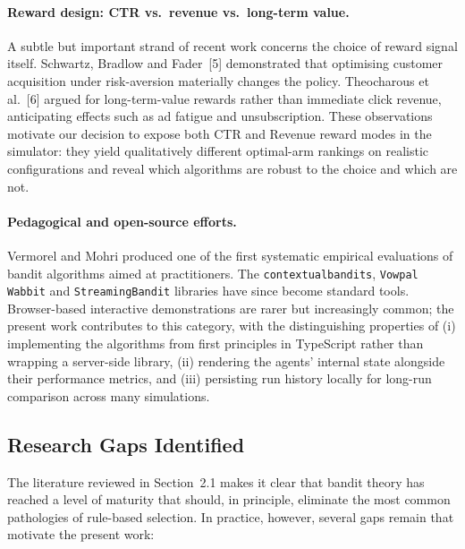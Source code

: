 \paragraph{Reward design: CTR vs.\ revenue vs.\ long-term value.}
A subtle but important strand of recent work concerns the choice of reward signal itself. Schwartz, Bradlow and Fader~[5] demonstrated that optimising customer acquisition under risk-aversion materially changes the policy. Theocharous et al.~[6] argued for long-term-value rewards rather than immediate click revenue, anticipating effects such as ad fatigue and unsubscription. These observations motivate our decision to expose both CTR and Revenue reward modes in the simulator: they yield qualitatively different optimal-arm rankings on realistic configurations and reveal which algorithms are robust to the choice and which are not.

\paragraph{Pedagogical and open-source efforts.}
Vermorel and Mohri produced one of the first systematic empirical evaluations of bandit algorithms aimed at practitioners. The \texttt{contextualbandits}, \texttt{Vowpal Wabbit} and \texttt{StreamingBandit} libraries have since become standard tools. Browser-based interactive demonstrations are rarer but increasingly common; the present work contributes to this category, with the distinguishing properties of (i) implementing the algorithms from first principles in TypeScript rather than wrapping a server-side library, (ii) rendering the agents' internal state alongside their performance metrics, and (iii) persisting run history locally for long-run comparison across many simulations.

\subsection{Research Gaps Identified}
The literature reviewed in Section~2.1 makes it clear that bandit theory has reached a level of maturity that should, in principle, eliminate the most common pathologies of rule-based selection. In practice, however, several gaps remain that motivate the present work:

